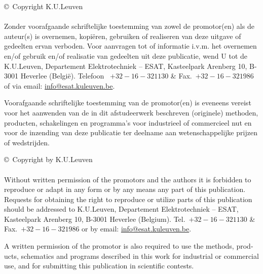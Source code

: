 \documentclass[main_adjusted]{subfiles}
\begin{document}
	
	\begin{small}\vspace*{\fill} \copyright\ Copyright K.U.Leuven\\
\\
Zonder voorafgaande schriftelijke toestemming van zowel de
promotor(en) als de auteur(s) is overnemen, kopi\"eren, gebruiken of
realiseren van deze uitgave of gedeelten ervan verboden. Voor
aanvragen tot of informatie i.v.m. het overnemen en/of gebruik
en/of realisatie van gedeelten uit deze publicatie, wend U tot de
K.U.Leuven, Departement Elektrotechniek -- ESAT, Kasteelpark
Arenberg 10, B-3001 Heverlee (Belgi\"e). Telefoon~ $+32-16-32 11
30$ \& Fax.~$+32-16-32 19 86$ of via email: \url{info@esat.kuleuven.be}.

Voorafgaande schriftelijke toestemming van de promotor(en) is
eveneens vereist voor het aanwenden van de in dit afstudeerwerk
beschreven (originele) methoden, producten, schakelingen en
programma's voor industrieel of commercieel nut en voor de
inzending van deze publicatie ter deelname aan wetenschappelijke
prijzen of wedstrijden.
	\end{small}
\vspace*{3cm}

\begin{otherlanguage}{english}
\begin{small}
\copyright\ Copyright by K.U.Leuven\\
\\
Without written permission of the promotors and the authors it is
forbidden to reproduce or adapt in any form or by any means any
part of this publication. Requests for obtaining the right to
reproduce or utilize parts of this publication should be addressed
to K.U.Leuven, Departement Elektrotechniek -- ESAT, Kasteelpark
Arenberg 10,  B-3001 Heverlee  (Belgium). Tel.~$+32-16-32 11
30$   \& Fax.~$+32-16-32 19 86$ or by email: \url{info@esat.kuleuven.be}.

A written permission of the promotor is also required to use the
methods, products, schematics and programs described in this work
for industrial or commercial use, and for submitting this
publication in scientific contests.
\end{small}
\end{otherlanguage}
\end{document}

